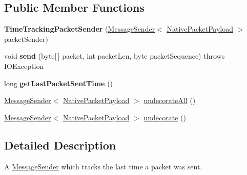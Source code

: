 \subsection*{Public Member Functions}
\begin{DoxyCompactItemize}
\item 
\mbox{\label{classcom_1_1mysql_1_1cj_1_1protocol_1_1a_1_1_time_tracking_packet_sender_a8e0719ea263ea8230a1b60b1cdaa9d0f}} 
{\bfseries Time\+Tracking\+Packet\+Sender} (\mbox{\hyperlink{interfacecom_1_1mysql_1_1cj_1_1protocol_1_1_message_sender}{Message\+Sender}}$<$ \mbox{\hyperlink{classcom_1_1mysql_1_1cj_1_1protocol_1_1a_1_1_native_packet_payload}{Native\+Packet\+Payload}} $>$ packet\+Sender)
\item 
\mbox{\label{classcom_1_1mysql_1_1cj_1_1protocol_1_1a_1_1_time_tracking_packet_sender_a5bb1efc7043c5417509cd079cc7abd0d}} 
void {\bfseries send} (byte\mbox{[}$\,$\mbox{]} packet, int packet\+Len, byte packet\+Sequence)  throws I\+O\+Exception 
\item 
\mbox{\label{classcom_1_1mysql_1_1cj_1_1protocol_1_1a_1_1_time_tracking_packet_sender_a0db4b1e081138c550906e898d9c9a79d}} 
long {\bfseries get\+Last\+Packet\+Sent\+Time} ()
\item 
\mbox{\hyperlink{interfacecom_1_1mysql_1_1cj_1_1protocol_1_1_message_sender}{Message\+Sender}}$<$ \mbox{\hyperlink{classcom_1_1mysql_1_1cj_1_1protocol_1_1a_1_1_native_packet_payload}{Native\+Packet\+Payload}} $>$ \mbox{\hyperlink{classcom_1_1mysql_1_1cj_1_1protocol_1_1a_1_1_time_tracking_packet_sender_a26a673b209acd1d181f62dceed280750}{undecorate\+All}} ()
\item 
\mbox{\hyperlink{interfacecom_1_1mysql_1_1cj_1_1protocol_1_1_message_sender}{Message\+Sender}}$<$ \mbox{\hyperlink{classcom_1_1mysql_1_1cj_1_1protocol_1_1a_1_1_native_packet_payload}{Native\+Packet\+Payload}} $>$ \mbox{\hyperlink{classcom_1_1mysql_1_1cj_1_1protocol_1_1a_1_1_time_tracking_packet_sender_a5e29cda7005857f658352ef487c541ac}{undecorate}} ()
\end{DoxyCompactItemize}


\subsection{Detailed Description}
A \mbox{\hyperlink{interfacecom_1_1mysql_1_1cj_1_1protocol_1_1_message_sender}{Message\+Sender}} which tracks the last time a packet was sent. 

